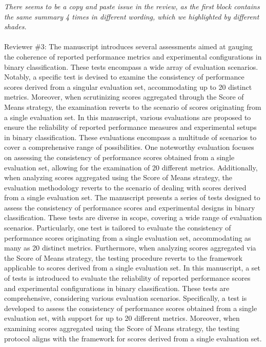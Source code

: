 \documentclass{article}
\begin{document}
\emph{There seems to be a copy and paste issue in the review, as the first block contains the same summary 4 times in different wording, which we highlighted by different shades.}
\\ \\
Reviewer \#3: The manuscript introduces several assessments aimed at gauging the coherence of reported performance metrics and experimental configurations in binary classification. These tests encompass a wide array of evaluation scenarios. Notably, a specific test is devised to examine the consistency of performance scores derived from a singular evaluation set, accommodating up to 20 distinct metrics. Moreover, when scrutinizing scores aggregated through the Score of Means strategy, the examination reverts to the scenario of scores originating from a single evaluation set. {\color{gray}In this manuscript, various evaluations are proposed to ensure the reliability of reported performance measures and experimental setups in binary classification. These evaluations encompass a multitude of scenarios to cover a comprehensive range of possibilities. One noteworthy evaluation focuses on assessing the consistency of performance scores obtained from a single evaluation set, allowing for the examination of 20 different metrics. Additionally, when analyzing scores aggregated using the Score of Means strategy, the evaluation methodology reverts to the scenario of dealing with scores derived from a single evaluation set.} The manuscript presents a series of tests designed to assess the consistency of performance scores and experimental designs in binary classification. These tests are diverse in scope, covering a wide range of evaluation scenarios. Particularly, one test is tailored to evaluate the consistency of performance scores originating from a single evaluation set, accommodating as many as 20 distinct metrics. Furthermore, when analyzing scores aggregated via the Score of Means strategy, the testing procedure reverts to the framework applicable to scores derived from a single evaluation set. {\color{gray}In this manuscript, a set of tests is introduced to evaluate the reliability of reported performance scores and experimental configurations in binary classification. These tests are comprehensive, considering various evaluation scenarios. Specifically, a test is developed to assess the consistency of performance scores obtained from a single evaluation set, with support for up to 20 different metrics. Moreover, when examining scores aggregated using the Score of Means strategy, the testing protocol aligns with the framework for scores derived from a single evaluation set.}
\end{document}

